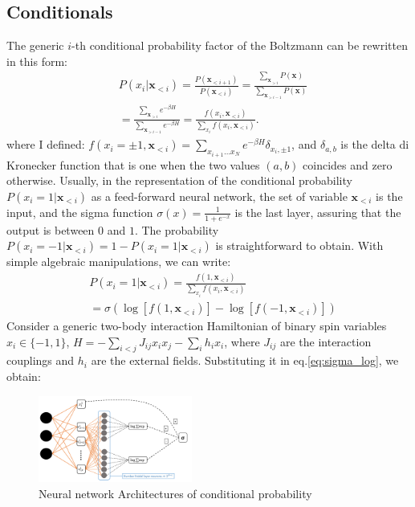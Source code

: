 \documentclass[aps,physrev,10pt,floatfix,reprint]{revtex4-2}
\begin{document}
\subsection{Conditionals}
The generic $i$-th conditional probability factor of the Boltzmann can be rewritten in this form: 
\begin{equation}
    \label{eq:chain}
    \begin{split}
    & P\left(x_{i}|\mathbf{x}_{<i}\right)  = 
    \frac{P\left(\mathbf{x}_{<i+1}\right)}{P\left(\mathbf{x}_{<i}\right)}  = 
    \frac{\sum_{\mathbf{x}_{>i}}P\left(\mathbf{x}\right)}{\sum_{\mathbf{x}_{>i-1}}P\left(\mathbf{x}\right)} \\
    &=\frac{\sum_{\mathbf{x}_{>i}}e^{-\beta H}}{\sum_{\mathbf{x}_{>i-1}}e^{-\beta H}}  = 
    \frac{f\left(x_{i},\mathbf{x}_{<i}\right)}{\sum_{x_{i}}f\left(x_{i},\mathbf{x}_{<i}\right)}.
    \end{split}
\end{equation}
where I defined: $f\left(x_{i}=\pm 1,\mathbf{x}_{<i}\right) = \sum_{x_{i+1}\dots x_{N}}e^{-\beta H}\delta_{x_i, \pm1}$, and $\delta_{a,b}$ is the delta di Kronecker function that is one when the two values $(a,b)$ coincides and zero otherwise. Usually, in the representation of the conditional probability $P\left(x_{i}=1|\mathbf{x}_{<i}\right)$ as a feed-forward neural network, the set of variable $\mathbf{x}_{<i}$ is the input, and the sigma function $\sigma(x)=\frac{1}{1+e^{-x}}$ is the last layer, assuring that the output is between $0$ and $1$. The probability $P\left(x_{i}=-1|\mathbf{x}_{<i}\right) = 1 - P\left(x_{i}=1|\mathbf{x}_{<i}\right)$ is straightforward to obtain. With simple algebraic manipulations, we can write: 
\begin{equation}
    \label{eq:sigma_log}
    \begin{split}
    & P\left(x_{i}=1|\mathbf{x}_{<i}\right) = \frac{f\left(1,\mathbf{x}_{<i}\right)}{\sum_{x_{i}}f\left(x_{i},\mathbf{x}_{<i}\right)}\\
    &= \sigma\left(\log\left[f\left(1,\mathbf{x}_{<i}\right)\right]-\log\left[f\left(-1,\mathbf{x}_{<i}\right)\right]\right)
    \end{split}
\end{equation}
Consider a generic two-body interaction Hamiltonian of binary spin variables $x_i \in \{-1,1\}$, $H = -\sum_{i<j} J_{ij} x_i x_j - \sum_{i} h_i x_i$, where $J_{ij}$ are the interaction couplings and $h_i$ are the external fields. Substituting it in eq.\ref{eq:sigma_log}, we obtain:
\begin{figure}[!ht]
    \includegraphics[width=0.45\textwidth]{img/h2ARNN.pdf}
    \caption{Neural network Architectures of conditional probability}
    \label{fig:arch}
\end{figure}
\end{document}
